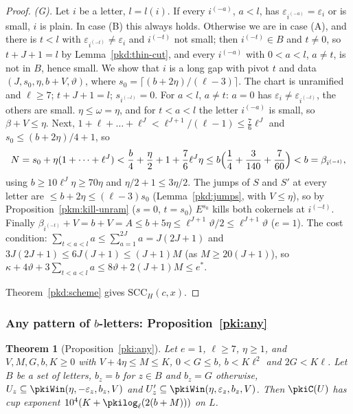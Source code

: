 \documentclass[10pt]{amsart}
\newtheorem{theorem}{Theorem}[section]
\theoremstyle{definition}
\theoremstyle{remark}
\begin{document}
\begin{proof}
\emph{(G).} Let $i$ be a letter, $l=l(i)$. If every $i^{(-a)}$, $a<l$, has
$\varepsilon_{i^{(-a)}}=\varepsilon_i$ or is small, $i$ is plain. In case (B) this always holds.
Otherwise we are in case (A), and there is $t<l$ with $\varepsilon_{i^{(-t)}}\ne\varepsilon_i$ and
$i^{(-t)}$ not small; then $i^{(-t)}\in B$ and $t\ne0$, so $t+J+1=l$ by Lemma~\ref{pkd:thin-cut}, and
every $i^{(-a)}$ with $0<a<l$, $a\ne t$, is not in $B$, hence small. We show that $i$ is a long gap
with pivot $t$ and data $(J,s_0,\eta,b+V,\vartheta)$, where $s_0=\lceil(b+2\eta)/(\ell-3)\rceil$.
The chart is unramified and $\ell\ge7$; $t+J+1=l$; $s_{i^{(-l)}}=0$. For $a<l$, $a\ne t$: $a=0$ has
$\varepsilon_i\ne\varepsilon_{i^{(-t)}}$, the others are small. $\eta\le\omega=\eta$, and for $t<a<l$
the letter $i^{(-a)}$ is small, so $\beta+V\le\eta$. Next,
$1+\ell+\dots+\ell^J<\ell^{J+1}/(\ell-1)\le\tfrac76\ell^J$ and $s_0\le(b+2\eta)/4+1$, so
\[
N=s_0+\eta(1+\dots+\ell^J)<\frac b4+\frac\eta2+1+\frac76\ell^J\eta
\le b\Bigl(\frac14+\frac3{140}+\frac7{60}\Bigr)<b=\beta_{i^{(-t)}},
\]
using $b\ge10\ell^J\eta\ge70\eta$ and $\eta/2+1\le3\eta/2$. The jumps of $S$ and $S'$ at every letter are
$\le b+2\eta\le(\ell-3)s_0$ (Lemma~\ref{pkd:jumps}, with $V\le\eta$), so by
Proposition~\ref{pkm:kill-unram} ($s=0$, $t=s_0$) $E^{s_0}$ kills both cokernels at $i^{(-t)}$. Finally
$\beta_{i^{(-t)}}+V=b+V=A\le b+5\eta\le\ell^{J+1}\vartheta/2\le\ell^{J+1}\vartheta$ ($e=1$). The cost
condition: $\sum_{t<a<l}a\le\sum_{a=1}^{2J}a=J(2J+1)$ and $3J(2J+1)\le6J(J+1)\le(J+1)M$ (as $M\ge20(J+1)$),
so $\kappa+4\vartheta+3\sum_{t<a<l}a\le8\vartheta+2(J+1)M\le e^*$.

Theorem~\ref{pkd:scheme} gives $\mathrm{SCC}_H(c,x)$.
\end{proof}

\subsubsection{Any pattern of $b$-letters: Proposition~\ref{pki:any}}\label{pkd:ss-any}

\begin{theorem}[Proposition~\ref{pki:any}]\label{pkd:any}
Let $e=1$, $\ell\ge7$, $\eta\ge1$, and $V,M,G,b,K\ge0$ with $V+4\eta\le M\le K$, $0<G\le b$,
$b<K\ell^2$ and $2G<K\ell$. Let $B$ be a set of letters, $b_z=b$ for $z\in B$ and $b_z=G$ otherwise,
$U_z\subseteq\pkiWin(\eta,-\varepsilon_z,b_z,V)$ and $U'_z\subseteq\pkiWin(\eta,\varepsilon_z,b_z,V)$.
Then $\pkiC(U)$ has cup exponent $10^4(K+\pkilog_\ell(2(b+M)))$ on $L$.
\end{theorem}
\end{document}
